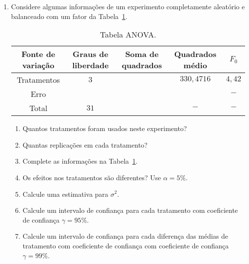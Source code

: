 \documentclass[11pt, a4paper]{article}
\begin{document}
\begin{enumerate}
	\item Considere algumas informações de um experimento completamente aleatório e balanceado com um fator da Tabela~\ref{tab:anova-ex2}.
	\begin{table}[htbp]
		\centering
		\begin{tabular}{c|c|c|c|c}
			\toprule[0.05cm]
			Fonte de variação & Graus de liberdade & Soma de quadrados & Quadrados médio & $F_0$ \\ \midrule[0.025cm]
			Tratamentos & $3$  & & $330,4716$ & $4,42$ \\
			\midrule[0.025cm]
			Erro & & &  & $-$\\ \midrule[0.025cm]
			Total & $31$ &  & $-$ & $-$\\
			\bottomrule[0.05cm]
		\end{tabular}
		\caption{Tabela ANOVA.}
		\label{tab:anova-ex2}
	\end{table}
	\begin{enumerate}
		\item Quantos tratamentos foram usados neste experimento?
		\item Quantas replicações em cada tratamento?
		\item Complete as informações na Tabela~\ref{tab:anova-ex2}. 
		\item Os efeitos nos tratamentos são diferentes? Use $\alpha=5\%$. 
		\item Calcule uma estimativa para $\sigma^2$.
		\item Calcule um intervalo de confiança para cada tratamento com coeficiente de confiança $\gamma=95\%$.
		\item Calcule um intervalo de confiança para cada diferença das médias de tratamento com coeficiente de confiança com coeficiente de confiança $\gamma=99\%$.
	\end{enumerate}


\end{enumerate}
\end{document}
